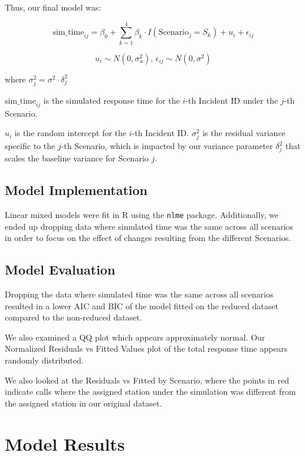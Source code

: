 \documentclass[
]{article}
\begin{document}
Thus, our final model was:

\[
\text{sim_time}_{ij} = \beta_0+\sum_{k=1}^4\beta_k\cdot I( \text{Scenario}_j = S_k) +u_i+\epsilon_{ij}
\]

\[
u_i \sim N(0, \sigma^2_u)\text{, }\epsilon_{ij} \sim N(0, \sigma^2)
\]

where \(\sigma^2_j = \sigma^2 \cdot\delta^2_j\)

\(\text{sim_time}_{ij}\) is the simulated response time for the \(i\)-th
Incident ID under the \(j\)-th Scenario.

\(u_i\) is the random intercept for the \(i\)-th Incident ID.
\(\sigma^2_j\) is the residual variance specific to the \(j\)-th
Scenario, which is impacted by our variance parameter \(\delta_j^2\)
that scales the baseline variance for Scenario \(j\).

\subsection{Model Implementation}\label{model-implementation}

Linear mixed models were fit in R using the \texttt{nlme} package.
Additionally, we ended up dropping data where simulated time was the
same across all scenarios in order to focus on the effect of changes
resulting from the different Scenarios.

\subsection{Model Evaluation}\label{model-evaluation}

Dropping the data where simulated time was the same across all scenarios
resulted in a lower AIC and BIC of the model fitted on the reduced
dataset compared to the non-reduced dataset.

We also examined a QQ plot which appears approximately normal. Our
Normalized Residuals vs Fitted Values plot of the total response time
appears randomly distributed.

We also looked at the Residuals vs Fitted by Scenario, where the points
in red indicate calls where the assigned station under the simulation
was different from the assigned station in our original dataset.

\section{Model Results}\label{model-results}
\end{document}
